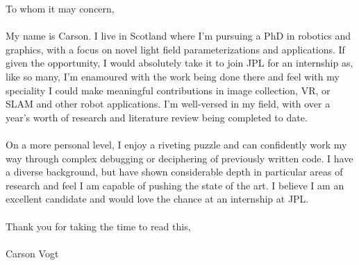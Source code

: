 \documentclass[12pt]{report}
\begin{document}
\noindent To whom it may concern,
\\ \\
My name is Carson. I live in Scotland where I'm pursuing a PhD in robotics and graphics, with a focus on novel light field parameterizations and applications. If given the opportunity, I would absolutely take it to join JPL for an internship as, like so many, I'm enamoured with the work being done there and feel with my speciality I could make meaningful contributions in image collection, VR, or SLAM and other robot applications. I'm well-versed in my field, with over a year's worth of research and literature review being completed to date.
\\ \\ 
On a more personal level, I enjoy a riveting puzzle and can confidently work my way through complex debugging or deciphering of previously written code. I have a diverse background, but have shown considerable depth in particular areas of research and feel I am capable of pushing the state of the art. I believe I am an excellent candidate and would love the chance at an internship at JPL.
\\ \\
Thank you for taking the time to read this,
\\ \\
Carson Vogt
\end{document}
